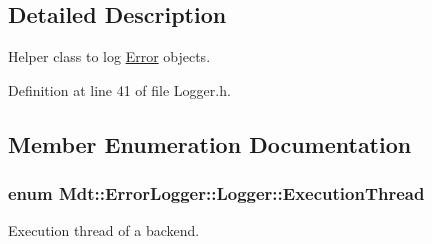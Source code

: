 \subsection{Detailed Description}
Helper class to log \hyperlink{class_mdt_1_1_error}{Error} objects. 

Definition at line 41 of file Logger.\+h.



\subsection{Member Enumeration Documentation}
\subsubsection[{\texorpdfstring{Execution\+Thread}{ExecutionThread}}]{\setlength{\rightskip}{0pt plus 5cm}enum {\bf Mdt\+::\+Error\+Logger\+::\+Logger\+::\+Execution\+Thread}}\hypertarget{class_mdt_1_1_error_logger_1_1_logger_ab6d6198b43b2bb94cede114ec67b781c}{}\label{class_mdt_1_1_error_logger_1_1_logger_ab6d6198b43b2bb94cede114ec67b781c}


Execution thread of a backend. 

